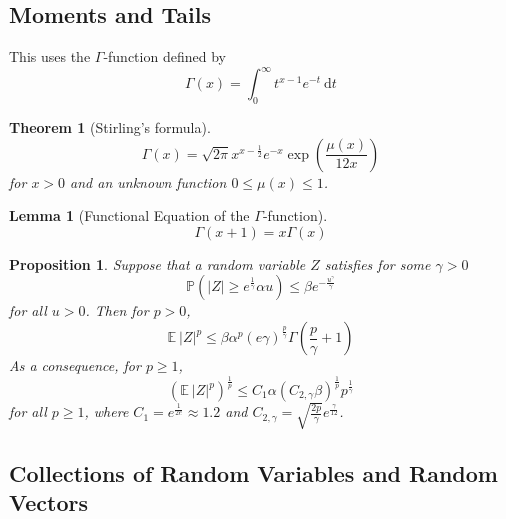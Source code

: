 \documentclass[10pt,a4paper]{article}
\theoremstyle{thmstyle}
\newtheorem{lemma}{Lemma}
\newtheorem{theorem}{Theorem}
\newtheorem{proposition}{Proposition}
\newcommand{\diff}{~\mathrm{d}}
\newcommand{\E}{\mathbb{E}~}
\renewcommand{\Pr}[1]{\mathbb{P}\left( #1 \right)}
\begin{document}
\subsection{Moments and Tails}

This uses the $\Gamma$-function defined by
\begin{equation*}
  \Gamma(x) = \int_{0}^{\infty} t^{x - 1} e^{-t} \diff t
\end{equation*}

\begin{theorem}[Stirling's formula]
  \begin{equation*}
    \Gamma(x) = \sqrt{2\pi} x^{x - \frac{1}{2}} e^{-x} \exp\left( \frac{\mu(x)}{12x} \right)
  \end{equation*}
  for $x > 0$ and an unknown function $0 \le \mu(x) \le 1$.
\end{theorem}

\begin{lemma}[Functional Equation of the $\Gamma$-function]
  \begin{equation*}
    \Gamma(x + 1) = x \Gamma(x)
  \end{equation*}
\end{lemma}

\begin{proposition}
  Suppose that a random variable $Z$ satisfies for some $\gamma > 0$
  \begin{equation*}
    \Pr{|Z| \ge e^{\frac{1}{\gamma}} \alpha u} \le \beta e^{-\frac{u^{\gamma}}{\gamma}}
  \end{equation*}
  for all $u > 0$.
  Then for $p > 0$,
  \begin{equation*}
    \E |Z|^{p} \le \beta \alpha^{p} (e \gamma)^{\frac{p}{\gamma}} \Gamma\left( \frac{p}{\gamma} + 1 \right)
  \end{equation*}
  As a consequence, for $p \ge 1$,
  \begin{equation*}
    \left( \E |Z|^{p} \right)^{\frac{1}{p}} \le C_{1} \alpha \left( C_{2,\gamma} \beta \right)^{\frac{1}{p}} p^{\frac{1}{\gamma}}
  \end{equation*}
  for all $p \ge 1$, where $C_{1} = e^{\frac{1}{2e}} \approx 1.2$ and $C_{2,\gamma} = \sqrt{\frac{2p}{\gamma}} e^{\frac{\gamma}{12}}$.
\end{proposition}

\subsection{Collections of Random Variables and Random Vectors}
\end{document}
